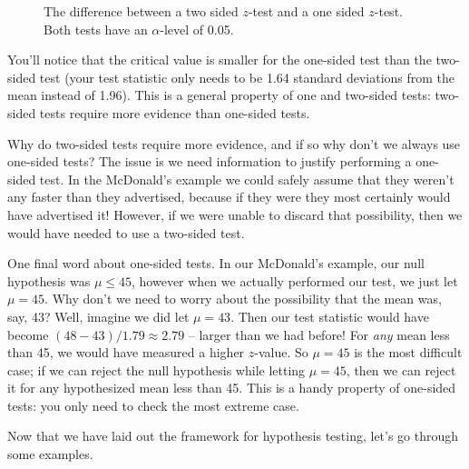 \begin{figure}[h!]

\begin{center}


\caption{\label{fig:twosidedvonesided}The difference between a two sided $z$-test and a one sided $z$-test.  Both tests have an $\alpha$-level of 0.05.}

\end{center}\end{figure}



You'll notice that the critical value is smaller for the one-sided test than the two-sided test (your test statistic only needs to be 1.64 standard deviations from the mean instead of 1.96). This is a general property of one and two-sided tests: two-sided tests require more evidence than one-sided tests.



Why do two-sided tests require more evidence, and if so why don't we always use one-sided tests? The issue is we need information to justify performing a one-sided test. In the McDonald's example we could safely assume that they weren't any faster than they advertised, because if they were they most certainly would have advertised it!  However, if we were unable to discard that possibility, then we would have needed to use a two-sided test.



One final word about one-sided tests.  In our McDonald's example, our null hypothesis was $\mu \leq 45$, however when we actually performed our test, we just let $\mu = 45$.  Why don't we need to worry about the possibility that the mean was, say, 43?  Well, imagine we did let $\mu = 43$.  Then our test statistic would have become $(48 - 43)/1.79 \approx 2.79$ -- larger than we had before!  For \emph{any} mean less than 45, we would have measured a higher $z$-value.  So $\mu = 45$ is the most difficult case; if we can reject the null hypothesis while letting $\mu = 45$, then we can reject it for any hypothesized mean less than 45.  This is a handy property of one-sided tests: you only need to check the most extreme case.



Now that we have laid out the framework for hypothesis testing, let's go through some examples.



\ \\



